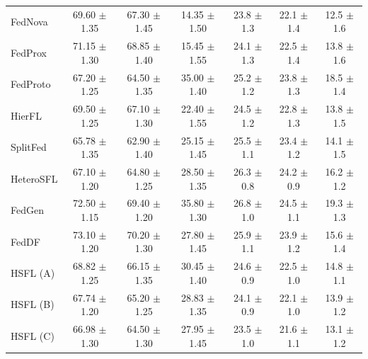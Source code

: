 \begin{table}[t]
{\begin{tabular}{l|ccc|ccc}
        FedNova & 69.60 {\scriptsize $\pm$ 1.35} & 67.30 {\scriptsize $\pm$ 1.45} & 14.35 {\scriptsize $\pm$ 1.50} & 23.8 {\scriptsize $\pm$ 1.3} & 22.1 {\scriptsize $\pm$ 1.4} & 12.5 {\scriptsize $\pm$ 1.6} \\
        FedProx & 71.15 {\scriptsize $\pm$ 1.30} & 68.85 {\scriptsize $\pm$ 1.40} & 15.45 {\scriptsize $\pm$ 1.55} & 24.1 {\scriptsize $\pm$ 1.3} & 22.5 {\scriptsize $\pm$ 1.4} & 13.8 {\scriptsize $\pm$ 1.6} \\
        FedProto & 67.20 {\scriptsize $\pm$ 1.25} & 64.50 {\scriptsize $\pm$ 1.35} & 35.00 {\scriptsize $\pm$ 1.40} & 25.2 {\scriptsize $\pm$ 1.2} & 23.8 {\scriptsize $\pm$ 1.3} & 18.5 {\scriptsize $\pm$ 1.4} \\
        HierFL & 69.50 {\scriptsize $\pm$ 1.25} & 67.10 {\scriptsize $\pm$ 1.30} & 22.40 {\scriptsize $\pm$ 1.55} & 24.5 {\scriptsize $\pm$ 1.2} & 22.8 {\scriptsize $\pm$ 1.3} & 13.8 {\scriptsize $\pm$ 1.5} \\
        SplitFed & 65.78 {\scriptsize $\pm$ 1.35} & 62.90 {\scriptsize $\pm$ 1.40} & 25.15 {\scriptsize $\pm$ 1.45} & 25.5 {\scriptsize $\pm$ 1.1} & 23.4 {\scriptsize $\pm$ 1.2} & 14.1 {\scriptsize $\pm$ 1.5} \\
        HeteroSFL & 67.10 {\scriptsize $\pm$ 1.20} & 64.80 {\scriptsize $\pm$ 1.25} & 28.50 {\scriptsize $\pm$ 1.35} & 26.3 {\scriptsize $\pm$ 0.8} & 24.2 {\scriptsize $\pm$ 0.9} & 16.2 {\scriptsize $\pm$ 1.2} \\
        FedGen & 72.50 {\scriptsize $\pm$ 1.15} & 69.40 {\scriptsize $\pm$ 1.20} & 35.80 {\scriptsize $\pm$ 1.30} & 26.8 {\scriptsize $\pm$ 1.0} & 24.5 {\scriptsize $\pm$ 1.1} & 19.3 {\scriptsize $\pm$ 1.3} \\
        FedDF & 73.10 {\scriptsize $\pm$ 1.20} & 70.20 {\scriptsize $\pm$ 1.30} & 27.80 {\scriptsize $\pm$ 1.45} & 25.9 {\scriptsize $\pm$ 1.1} & 23.9 {\scriptsize $\pm$ 1.2} & 15.6 {\scriptsize $\pm$ 1.4} \\
        \midrule
        HSFL (A) & 68.82 {\scriptsize $\pm$ 1.25} & 66.15 {\scriptsize $\pm$ 1.35} & 30.45 {\scriptsize $\pm$ 1.40} & 24.6 {\scriptsize $\pm$ 0.9} & 22.5 {\scriptsize $\pm$ 1.0} & 14.8 {\scriptsize $\pm$ 1.1} \\
        HSFL (B) & 67.74 {\scriptsize $\pm$ 1.20} & 65.20 {\scriptsize $\pm$ 1.25} & 28.83 {\scriptsize $\pm$ 1.35} & 24.1 {\scriptsize $\pm$ 0.9} & 22.1 {\scriptsize $\pm$ 1.0} & 13.9 {\scriptsize $\pm$ 1.2} \\
        HSFL (C) & 66.98 {\scriptsize $\pm$ 1.30} & 64.50 {\scriptsize $\pm$ 1.30} & 27.95 {\scriptsize $\pm$ 1.45} & 23.5 {\scriptsize $\pm$ 1.0} & 21.6 {\scriptsize $\pm$ 1.1} & 13.1 {\scriptsize $\pm$ 1.2} \\

\end{tabular}}
\end{table}
